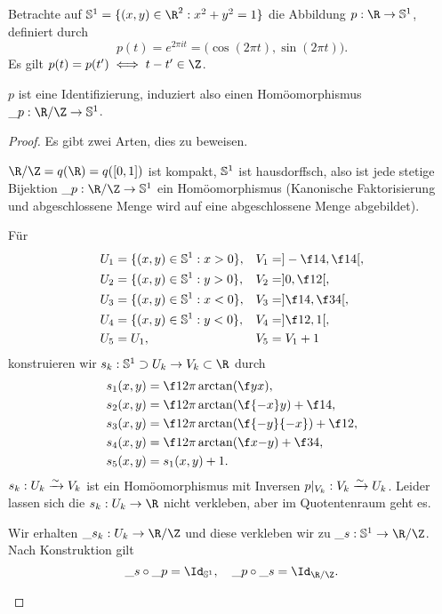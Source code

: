 \begin{ex}
	Betrachte auf $\S^1 = \{ (x,y) \in \R^2 : x^2 + y^2 = 1 \}$ die Abbildung $p: \R \to \S^1$, definiert durch
	\[
		p(t) = e^{2\pi i t} = \Big( \cos(2\pi t), \sin(2\pi t) \Big).
	\]
	Es gilt $p(t) = p(t') \iff t - t' \in \Z$.

	$p$ ist eine Identifizierung, induziert also einen Homöomorphismus $\_p : \R / \Z \to \S^1$.
	\begin{proof}
		Es gibt zwei Arten, dies zu beweisen.
		\begin{seg}
			$\R / \Z = q(\R) = q([0,1])$ ist kompakt, $\S^1$ ist hausdorffsch, also ist jede stetige Bijektion $\_p: \R / \Z \to \S^1$ ein Homöomorphismus (Kanonische Faktorisierung und abgeschlossene Menge wird auf eine abgeschlossene Menge abgebildet).
		\end{seg}
		\begin{seg}
			Für
			\begin{align*}
				U_1 &= \{ (x,y) \in \S^1 : x > 0 \},&
				V_1 &= ] - \f 14, \f 14 [, \\
				U_2 &= \{ (x,y) \in \S^1 : y > 0 \},&
				V_2 &= ] 0, \f 12 [, \\
				U_3 &= \{ (x,y) \in \S^1 : x < 0 \},&
				V_3 &= ] \f 14, \f 34 [, \\
				U_4 &= \{ (x,y) \in \S^1 : y < 0 \},&
				V_4 &= ] \f 12, 1 [, \\
				U_5 &= U_1,&
				V_5 &= V_1 + 1
			\end{align*}
			konstruieren wir $s_k: \S^1 \supset U_k \to V_k \subset \R$ durch
			\begin{align*}
				s_1(x,y) &= \f 1{2\pi} \arctan(\f yx), \\
				s_2(x,y) &= \f 1{2\pi} \arctan(\f {-x}y) + \f 14, \\
				s_3(x,y) &= \f 1{2\pi} \arctan(\f {-y}{-x}) + \f 12, \\
				s_4(x,y) &= \f 1{2\pi} \arctan(\f x{-y}) + \f 34, \\
				s_5(x,y) &= s_1(x,y) + 1.
			\end{align*}
			$s_k : U_k \homto V_k$ ist ein Homöomorphismus mit Inversen $p|_{V_k} : V_k \homto U_k$.
			Leider lassen sich die $s_k: U_k \to \R$ nicht verkleben, aber im Quotentenraum geht es.


			Wir erhalten $\_{s_k}: U_k \to \R / \Z$ und diese verkleben wir zu $\_s: \S^1 \to \R / \Z$.
			Nach Konstruktion gilt
			\[
				\_s \circ \_p = \Id_{\S^1}, \quad
				\_p \circ \_s = \Id_{\R / \Z}.
			\]
		\end{seg}
	\end{proof}
\end{ex}

